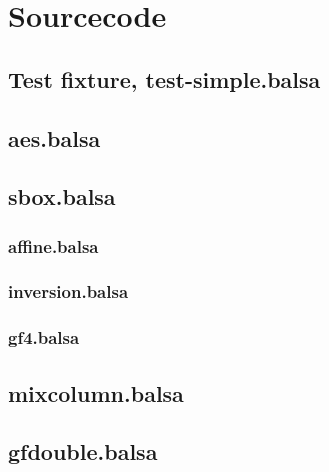 \section{Sourcecode}


\subsection{Test fixture, test-simple.balsa}


\subsection{aes.balsa}


\subsection{sbox.balsa}


\subsubsection{affine.balsa}


\subsubsection{inversion.balsa}


\subsubsection{gf4.balsa}



\subsection{mixcolumn.balsa}


\subsection{gfdouble.balsa}

